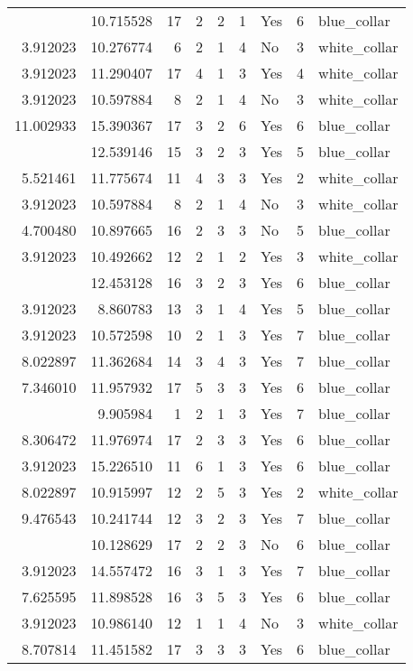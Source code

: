 \documentclass[
]{article}
\begin{document}
\begin{longtable}[t]{rrrrrllrl}
\addlinespace
7.346010 & 10.715528 & 17 & 2 & 2 & 1 & Yes & 6 & blue\_collar\\
3.912023 & 10.276774 & 6 & 2 & 1 & 4 & No & 3 & white\_collar\\
3.912023 & 11.290407 & 17 & 4 & 1 & 3 & Yes & 4 & white\_collar\\
3.912023 & 10.597884 & 8 & 2 & 1 & 4 & No & 3 & white\_collar\\
11.002933 & 15.390367 & 17 & 3 & 2 & 6 & Yes & 6 & blue\_collar\\
\addlinespace
10.820778 & 12.539146 & 15 & 3 & 2 & 3 & Yes & 5 & blue\_collar\\
5.521461 & 11.775674 & 11 & 4 & 3 & 3 & Yes & 2 & white\_collar\\
3.912023 & 10.597884 & 8 & 2 & 1 & 4 & No & 3 & white\_collar\\
4.700480 & 10.897665 & 16 & 2 & 3 & 3 & No & 5 & blue\_collar\\
3.912023 & 10.492662 & 12 & 2 & 1 & 2 & Yes & 3 & white\_collar\\
\addlinespace
10.128629 & 12.453128 & 16 & 3 & 2 & 3 & Yes & 6 & blue\_collar\\
3.912023 & 8.860783 & 13 & 3 & 1 & 4 & Yes & 5 & blue\_collar\\
3.912023 & 10.572598 & 10 & 2 & 1 & 3 & Yes & 7 & blue\_collar\\
8.022897 & 11.362684 & 14 & 3 & 4 & 3 & Yes & 7 & blue\_collar\\
7.346010 & 11.957932 & 17 & 5 & 3 & 3 & Yes & 6 & blue\_collar\\
\addlinespace
3.912023 & 9.905984 & 1 & 2 & 1 & 3 & Yes & 7 & blue\_collar\\
8.306472 & 11.976974 & 17 & 2 & 3 & 3 & Yes & 6 & blue\_collar\\
3.912023 & 15.226510 & 11 & 6 & 1 & 3 & Yes & 6 & blue\_collar\\
8.022897 & 10.915997 & 12 & 2 & 5 & 3 & Yes & 2 & white\_collar\\
9.476543 & 10.241744 & 12 & 3 & 2 & 3 & Yes & 7 & blue\_collar\\
\addlinespace
8.846497 & 10.128629 & 17 & 2 & 2 & 3 & No & 6 & blue\_collar\\
3.912023 & 14.557472 & 16 & 3 & 1 & 3 & Yes & 7 & blue\_collar\\
7.625595 & 11.898528 & 16 & 3 & 5 & 3 & Yes & 6 & blue\_collar\\
3.912023 & 10.986140 & 12 & 1 & 1 & 4 & No & 3 & white\_collar\\
8.707814 & 11.451582 & 17 & 3 & 3 & 3 & Yes & 6 & blue\_collar\\

\end{longtable}
\end{document}
